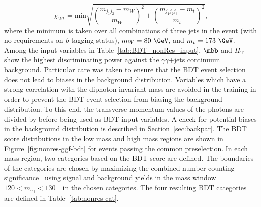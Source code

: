 \documentclass[PAPER, cernpreprint, texlive=2016, paper=a4, USenglish, texmf]{atlasdoc}
\begin{document}
\begin{equation}
\label{eq:topness}
\chi_{Wt} = \text{min}\sqrt{{ \left(\frac{m_{j_1j_2} - m_W}{m_W} \right)}^2 + { \left(\frac{m_{j_1j_2j_3} - m_t}{m_t} \right)}^2},
\end{equation}
where the minimum is taken over all combinations of three jets in the event (with no requirements on $b$-tagging status), $m_W = 80~\GeV$, and $m_t = 173~\GeV$.
Among the input variables in Table~\ref{tab:BDT_nonRes_input}, $\mbb$ and $H_{\text{T}}$ show the highest discriminating power against the $\gamma \gamma$+jets continuum background.
Particular care was taken to ensure that the BDT event selection does not lead to biases in the \myy{} background distribution.
Variables which have a strong correlation with the diphoton invariant mass are avoided in the training in order to prevent the BDT event selection from biasing the \myy{} background distribution.
To this end, the transverse momentum values of the photons are divided by \myy{} before being used as BDT input variables. A check for potential biases in the \myy{} background distribution is described in Section~\ref{sec:backpar}.
The BDT score distributions in the low mass and high mass regions are shown in Figure~\ref{fig:nonres-ggf-bdt} for events passing the common preselection. In each mass region, two categories based on the BDT score are defined. The boundaries of the categories are chosen by maximizing the combined number-counting significance~\cite{Cowan:2010js} using signal and background yields in the mass window $120 < m_{\gamma\gamma} < 130$~\GeV\ in the chosen categories.
The four resulting BDT categories are defined in Table~\ref{tab:nonres-cat}.
 
\end{document}
